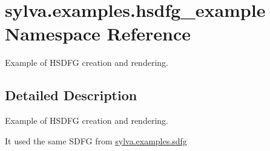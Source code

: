\hypertarget{namespacesylva_1_1examples_1_1hsdfg__example}{}\section{sylva.\+examples.\+hsdfg\+\_\+example Namespace Reference}
\label{namespacesylva_1_1examples_1_1hsdfg__example}


Example of H\+S\+D\+FG creation and rendering.  




\subsection{Detailed Description}
Example of H\+S\+D\+FG creation and rendering. 

It used the same S\+D\+FG from \hyperlink{namespacesylva_1_1examples_1_1sdfg}{sylva.\+examples.\+sdfg} 